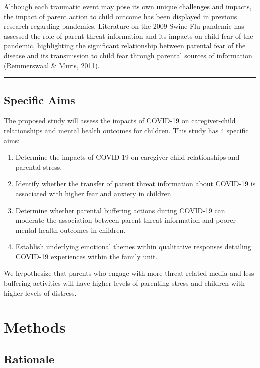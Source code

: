 \documentclass[]{book}
\providecommand{\tightlist}{%
  \setlength{\itemsep}{0pt}\setlength{\parskip}{0pt}}
\begin{document}
Although each traumatic event may pose its own unique challenges and impacts, the impact of parent action to child outcome has been displayed in previous research regarding pandemics. Literature on the 2009 Swine Flu pandemic has assessed the role of parent threat information and its impacts on child fear of the pandemic, highlighting the significant relationship between parental fear of the disease and its transmission to child fear through parental sources of information (Remmerswaal \& Muris, 2011).

\begin{center}\rule{0.5\linewidth}{0.5pt}\end{center}

\hypertarget{specific-aims}{%
\section{Specific Aims}\label{specific-aims}}

The proposed study will assess the impacts of COVID-19 on caregiver-child relationships and mental health outcomes for children. This study has 4 specific aims:

\begin{enumerate}
\def\labelenumi{(\arabic{enumi})}
\tightlist
\item
  Determine the impacts of COVID-19 on caregiver-child relationships and parental stress.
\item
  Identify whether the transfer of parent threat information about COVID-19 is associated with higher fear and anxiety in children.
\item
  Determine whether parental buffering actions during COVID-19 can moderate the association between parent threat information and poorer mental health outcomes in children.
\item
  Establish underlying emotional themes within qualitative responses detailing COVID-19 experiences within the family unit.
\end{enumerate}

We hypothesize that parents who engage with more threat-related media and less buffering activities will have higher levels of parenting stress and children with higher levels of distress.

\hypertarget{methods}{%
\chapter{Methods}\label{methods}}

\hypertarget{rationale}{%
\section{Rationale}\label{rationale}}
\end{document}
